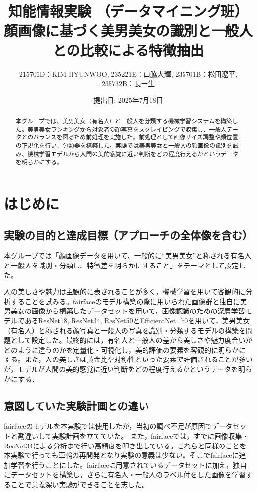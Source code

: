 \documentclass[a4paper,11pt,titlepage]{jsarticle}
\begin{document}
\title{知能情報実験 （データマイニング班）\\顔画像に基づく美男美女の識別と一般人との比較による特徴抽出}
\author{215706D：KIM HYUNWOO, 235221E：山脇大輝, 235701B：松田遼平, 235732B：長一生}
\date{提出日: 2025年7月18日}
\maketitle

\tableofcontents
\clearpage

\begin{abstract}
本グループでは、美男美女（有名人）と一般人を分類する機械学習システムを構築した。美男美女ランキングから対象者の顔写真をスクレイピングで収集し、一般人データとのバランスを図るため前処理を実施した。前処理として画像サイズ調整や顔位置の正規化を行い、分類器を構築した。実験では美男美女と一般人の顔画像の識別を試み、機械学習モデルから人間の美的感覚に近い判断をどの程度行えるかというデータを明らかにする。
\end{abstract} 


\section{はじめに}
\subsection{実験の目的と達成目標（アプローチの全体像を含む）}
本グループでは「顔画像データを用いて、一般的に“美男美女”と称される有名人と一般人を識別・分類し、特徴差を明らかにすること」をテーマとして設定した。

人の美しさや魅力は主観的に表されることが多く，機械学習を用いて客観的に分析することを試みる。fairfaceのモデル構築の際に用いられた画像群と独自に美男美女の画像から構築したデータセットを用いて，画像認識のための深層学習モデルであるResNet18, ResNet34, ResNet50とEfficientNet\_b0を用いて，美男美女（有名人）と称される顔写真と一般人の写真を識別・分類するモデルの構築を問題として設定した。最終的には，有名人と一般人の差から美しさや魅力度合いがどのように違うのかを定量化・可視化し，美的評価の要素を客観的に明らかにする。また，人の美しさは黄金比や対称性といった要素で評価されることが多いが，モデルが人間の美的感覚に近い判断をどの程度行えるかというデータを明らかにする．

\subsection{意図していた実験計画との違い}
fairfaceのモデルを本実験では使用したが，当初の調べ不足が原因でデータセットと勘違いして実験計画を立てていた。
また，fairfaceでは，すでに画像収集・ResNet34による分析まで行い高精度を叩き出している。これらと同様のことを本実験で行っても車輪の再開発となり実験の意義は少ない。そこでfairfaceに追加学習を行うことにした。fairfaceに用意されているデータセットに加え，独自にデータセットを構築し，さらに有名人・一般人のラベル付をした画像を学習することで意義深い実験ができることを志した。
\end{document}
